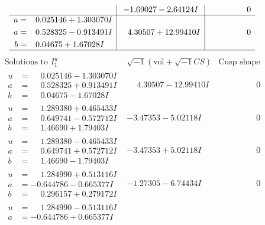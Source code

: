 \documentclass[1p]{elsarticle_modified}
\theoremstyle{definition}
\newcommand{\I}{\sqrt{-1}}
\begin{document}
$$\begin{array}{c|c|c}
 & -1.69027 - 2.64124 I & \phantom{-0.000000 } 0 \\ \hline\begin{aligned}
u &= \phantom{-}0.025146 + 1.303070 I \\
a &= \phantom{-}0.528325 - 0.913491 I \\
b &= \phantom{-}0.04675 + 1.67028 I\end{aligned}
 & \phantom{-}4.30507 + 12.99410 I & \phantom{-0.000000 } 0\\
 \hline 
 \end{array}$$\newpage$$\begin{array}{c|c|c}  
\text{Solutions to }I^u_{1}& \I (\text{vol} + \sqrt{-1}CS) & \text{Cusp shape}\\
 \hline 
\begin{aligned}
u &= \phantom{-}0.025146 - 1.303070 I \\
a &= \phantom{-}0.528325 + 0.913491 I \\
b &= \phantom{-}0.04675 - 1.67028 I\end{aligned}
 & \phantom{-}4.30507 - 12.99410 I & \phantom{-0.000000 } 0 \\ \hline\begin{aligned}
u &= \phantom{-}1.289380 + 0.465433 I \\
a &= \phantom{-}0.649741 - 0.572712 I \\
b &= \phantom{-}1.46690 + 1.79403 I\end{aligned}
 & -3.47353 - 5.02118 I & \phantom{-0.000000 } 0 \\ \hline\begin{aligned}
u &= \phantom{-}1.289380 - 0.465433 I \\
a &= \phantom{-}0.649741 + 0.572712 I \\
b &= \phantom{-}1.46690 - 1.79403 I\end{aligned}
 & -3.47353 + 5.02118 I & \phantom{-0.000000 } 0 \\ \hline\begin{aligned}
u &= \phantom{-}1.284990 + 0.513116 I \\
a &= -0.644786 - 0.665377 I \\
b &= \phantom{-}0.296157 + 0.279172 I\end{aligned}
 & -1.27305 - 6.74434 I & \phantom{-0.000000 } 0 \\ \hline\begin{aligned}
u &= \phantom{-}1.284990 - 0.513116 I \\
a &= -0.644786 + 0.665377 I \\

\end{aligned}
\end{array}$$
\end{document}
